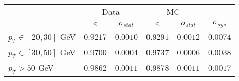 \begin{tabular}{|l||c|c||c|c||c|}
\hline
&\multicolumn{2}{c||}{Data}&\multicolumn{2}{c||}{MC}&\multicolumn{1}{c|}{}\\ & $\varepsilon$ & $\sigma_{stat}$ & $\varepsilon$ & $\sigma_{stat}$ & $\sigma_{sys}$\\ 
\hline\hline
$p_{T}\in[20,30]$ GeV &  $0.9217$ &  $0.0010$ &  $0.9291$ &  $0.0012$ &  $0.0074$\\ 
$p_{T}\in[30,50]$ GeV &  $0.9700$ &  $0.0004$ &  $0.9737$ &  $0.0006$ &  $0.0038$\\ 
$p_{T} > 50$ GeV &  $0.9862$ &  $0.0011$ &  $0.9878$ &  $0.0011$ &  $0.0017$\\ 
\hline
\end{tabular}
